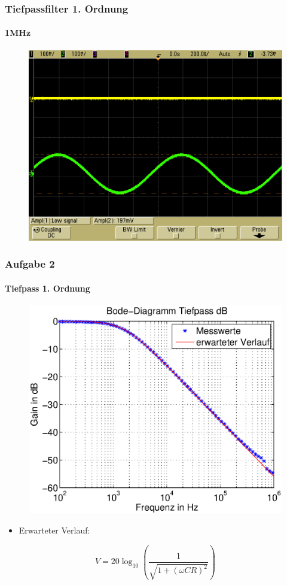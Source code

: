 \begin{frame}
    \frametitle{Tiefpassfilter 1. Ordnung}
    \framesubtitle{1MHz}
     \begin{figure}[H]
     \begin{center}
             \includegraphics[scale=0.2]{./img/2a_tief_1MHz.png}
     \end{center}
     \end{figure}
\end{frame}
\begin{frame}
\frametitle{Aufgabe 2}
\framesubtitle{Tiefpass 1. Ordnung}
\begin{figure}[H]
\begin{center}
        \includegraphics[scale=0.45]{./img/2a_bode_tief_dB.eps}
\end{center}
\end{figure}
\begin{itemize}
    \item Erwarteter Verlauf:
\end{itemize}
    \begin{equation*}
        V = 20 \log_{10} \left( \frac{1}{\sqrt{1+(\omega C R)^2}}\right)
    \end{equation*}
\end{frame}
